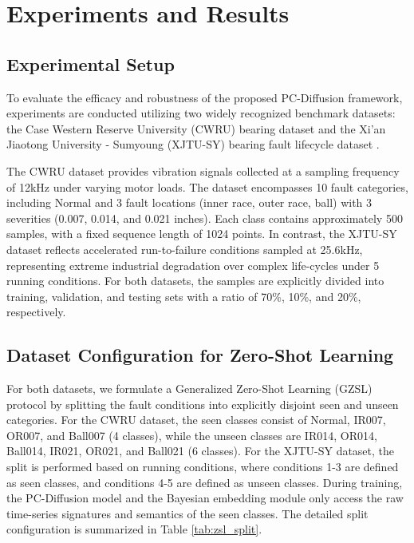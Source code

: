 \section{Experiments and Results}
\label{sec:experiments}

\subsection{Experimental Setup}
To evaluate the efficacy and robustness of the proposed PC-Diffusion framework, experiments are conducted utilizing two widely recognized benchmark datasets: the Case Western Reserve University (CWRU) bearing dataset \cite{cwru2023bearing} and the Xi'an Jiaotong University - Sumyoung (XJTU-SY) bearing fault lifecycle dataset \cite{wang2018xjtu}. 

The CWRU dataset provides vibration signals collected at a sampling frequency of 12kHz under varying motor loads. The dataset encompasses 10 fault categories, including Normal and 3 fault locations (inner race, outer race, ball) with 3 severities (0.007, 0.014, and 0.021 inches). Each class contains approximately 500 samples, with a fixed sequence length of 1024 points. In contrast, the XJTU-SY dataset reflects accelerated run-to-failure conditions sampled at 25.6kHz, representing extreme industrial degradation over complex life-cycles under 5 running conditions. For both datasets, the samples are explicitly divided into training, validation, and testing sets with a ratio of 70\%, 10\%, and 20\%, respectively.

\subsection{Dataset Configuration for Zero-Shot Learning}
For both datasets, we formulate a Generalized Zero-Shot Learning (GZSL) protocol by splitting the fault conditions into explicitly disjoint seen and unseen categories. For the CWRU dataset, the seen classes consist of Normal, IR007, OR007, and Ball007 (4 classes), while the unseen classes are IR014, OR014, Ball014, IR021, OR021, and Ball021 (6 classes). For the XJTU-SY dataset, the split is performed based on running conditions, where conditions 1-3 are defined as seen classes, and conditions 4-5 are defined as unseen classes. During training, the PC-Diffusion model and the Bayesian embedding module only access the raw time-series signatures and semantics of the seen classes. The detailed split configuration is summarized in Table \ref{tab:zsl_split}.

